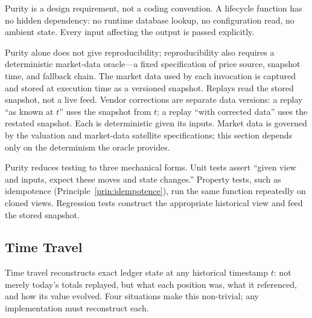 Purity is a design requirement, not a coding convention. A lifecycle function has no hidden dependency: no runtime database lookup, no configuration read, no ambient state. Every input affecting the output is passed explicitly.

Purity alone does not give reproducibility; reproducibility also requires a deterministic market-data oracle---a fixed specification of price source, snapshot time, and fallback chain. The market data used by each invocation is captured and stored at execution time as a versioned snapshot. Replays read the stored snapshot, not a live feed. Vendor corrections are separate data versions: a replay ``as known at $t$'' uses the snapshot from $t$; a replay ``with corrected data'' uses the restated snapshot. Each is deterministic given its inputs. Market data is governed by the valuation and market-data satellite specifications; this section depends only on the determinism the oracle provides.

Purity reduces testing to three mechanical forms. Unit tests assert ``given view and inputs, expect these moves and state changes.'' Property tests, such as idempotence (Principle~\ref{prin:idempotence}), run the same function repeatedly on cloned views. Regression tests construct the appropriate historical view and feed the stored snapshot.

\subsection{Time Travel}

Time travel reconstructs exact ledger state at any historical timestamp $t$: not merely today's totals replayed, but what each position was, what it referenced, and how its value evolved. Four situations make this non-trivial; any implementation must reconstruct each.

